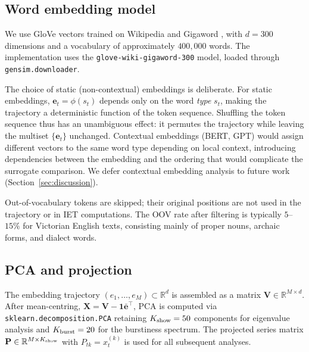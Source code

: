 \documentclass[12pt,a4paper]{article}
\newcommand{\xtk}{x_t^{(k)}}
\newcommand{\et}{\mathbf{e}_t}
\newcommand{\ebar}{\bar{\mathbf{e}}}
\newcommand{\R}{\mathbb{R}}
\begin{document}
\subsection{Word embedding model}
\label{sec:embedding}

We use GloVe vectors trained on Wikipedia and Gigaword
\citep{Pennington2014}, with $d = 300$ dimensions and a vocabulary of
approximately $400{,}000$ words. The implementation uses the
\texttt{glove-wiki-\allowbreak gigaword-300} model, loaded through
\texttt{gensim.\allowbreak downloader}.

The choice of static (non-contextual) embeddings is deliberate.
For static embeddings, $\et = \phi(s_t)$ depends only on the word
\emph{type} $s_t$, making the trajectory a deterministic function of
the token sequence.
Shuffling the token sequence thus has an unambiguous effect: it
permutes the trajectory while leaving the multiset $\{\et\}$
unchanged.
Contextual embeddings (BERT, GPT) would assign different vectors to
the same word type depending on local context, introducing dependencies
between the embedding and the ordering that would complicate the
surrogate comparison.
We defer contextual embedding analysis to future work
(Section~\ref{sec:discussion}).

Out-of-vocabulary tokens are skipped; their original positions are not
used in the trajectory or in IET computations.
The OOV rate after filtering is typically $5$--$15\%$ for Victorian
English texts, consisting mainly of proper nouns, archaic forms, and
dialect words.

\subsection{PCA and projection}
\label{sec:pca_pipeline}

The embedding trajectory $(e_1, \ldots, e_M) \subset \R^d$ is
assembled as a matrix $\mathbf{V} \in \R^{M \times d}$.
After mean-centring, $\mathbf{X} = \mathbf{V} - \mathbf{1}\ebar^\top$,
PCA is computed via \texttt{sklearn.decomposition.PCA} retaining
$K_{\rm show} = 50$ components for eigenvalue analysis and
$K_{\rm burst} = 20$ for the burstiness spectrum.
The projected series matrix $\mathbf{P} \in \R^{M \times K_{\rm show}}$
with $P_{tk} = \xtk$ is used for all subsequent analyses.
\end{document}
